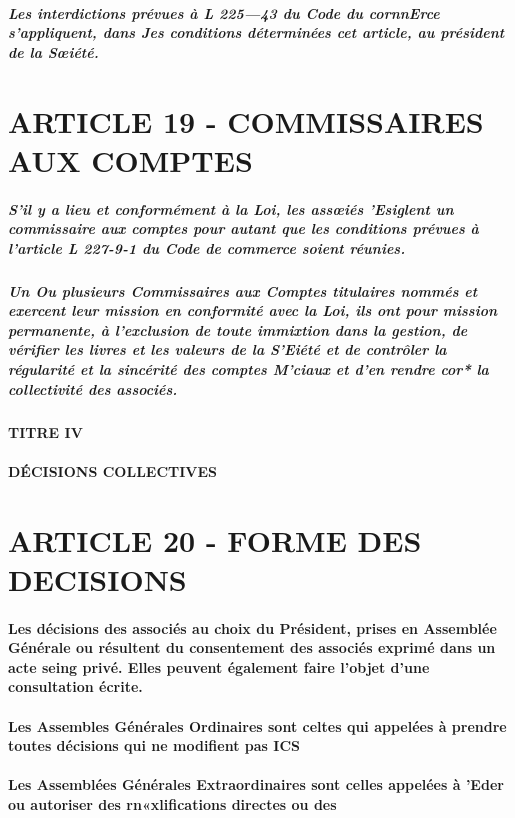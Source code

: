\documentclass[a4paper, 11pt]{article}
\begin{document}
\subparagraph{
  Les interdictions prévues à L 225—43 du Code du cornnErce s'appliquent, dans Jes conditions déterminées cet article, au président de la Sœiété.
}

\section*{ARTICLE 19 - COMMISSAIRES AUX COMPTES}

\subparagraph{
  S'il y a lieu et conformément à la Loi, les assœiés 'Esiglent un commissaire aux comptes pour autant que les conditions prévues à l'article L 227-9-1 du Code de commerce soient réunies.
}

\subparagraph{
  Un Ou plusieurs Commissaires aux Comptes titulaires nommés et exercent leur mission en conformité avec la Loi, ils ont pour mission permanente, à l'exclusion de toute immixtion dans la gestion, de vérifier les livres et les valeurs de la S'Eiété et de contrôler la régularité et la sincérité des comptes M'ciaux et d'en rendre cor* la collectivité des associés.
}

\paragraph{
  TITRE IV\\
  \\
  DÉCISIONS COLLECTIVES
}

\section*{ARTICLE 20 - FORME DES DECISIONS}

\paragraph{
  Les décisions des associés au choix du Président, prises en Assemblée Générale ou résultent du consentement des associés exprimé dans un acte seing privé. Elles peuvent également faire l'objet d'une consultation écrite.
}

\paragraph{
  Les Assembles Générales Ordinaires sont celtes qui appelées à prendre toutes décisions qui ne modifient pas ICS
}

\paragraph{
  Les Assemblées Générales Extraordinaires sont celles appelées à 'Eder ou autoriser des rn«xlifications directes ou des
}
\end{document}

